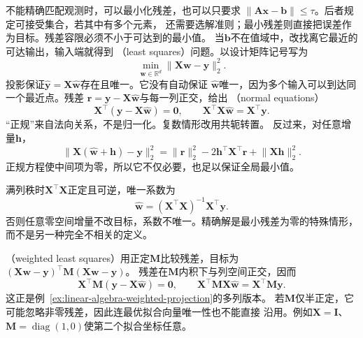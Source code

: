 \label{sec:matrix-analysis-inverse-input-selection}

不能精确匹配观测时，可以最小化残差，也可以只要求
$\lVert\bm A\bm x-\bm b\rVert\leq\tau$。后者规定可接受集合，若其中有多个元素，
还需要选解准则；最小残差则直接把误差作为目标。残差容限必须不小于可达到的最小值。
当$\bm b$不在值域中，改找离它最近的可达输出，输入端就得到
（least squares）问题。以设计矩阵记号写为
\begin{equation}
 \min_{\bm w\in\mathbb R^d}\lVert\bm X\bm w-\bm y\rVert_2^2.
 \label{eq:linear-algebra-least-squares}
\end{equation}
投影保证$\widehat{\bm y}=\bm X\widehat{\bm w}$存在且唯一。它没有自动保证
$\widehat{\bm w}$唯一，因为多个输入可以到达同一个最近点。残差
$\bm r=\bm y-\bm X\widehat{\bm w}$与每一列正交，给出
（normal equations）
\begin{equation}
 \bm X^\top(\bm y-\bm X\widehat{\bm w})=\bm0,
 \qquad
 \bm X^\top\bm X\widehat{\bm w}=\bm X^\top\bm y.
 \label{eq:linear-algebra-normal-equations}
\end{equation}
“正规”来自法向关系，不是归一化。复数情形改用共轭转置。
反过来，对任意增量$\bm h$，
\[
 \lVert\bm X(\widehat{\bm w}+\bm h)-\bm y\rVert_2^2
 =\lVert\bm r\rVert_2^2-2\bm h^\top\bm X^\top\bm r
  +\lVert\bm X\bm h\rVert_2^2.
\]
正规方程使中间项为零，所以它不仅必要，也足以保证全局最小值。

满列秩时$\bm X^\top\bm X$正定且可逆，唯一系数为
\begin{equation}
 \widehat{\bm w}=(\bm X^\top\bm X)^{-1}\bm X^\top\bm y.
 \label{eq:linear-algebra-full-rank-least-squares}
\end{equation}
否则任意零空间增量不改目标，系数不唯一。精确解是最小残差为零的特殊情形，
而不是另一种完全不相关的定义。

（weighted least squares）用正定$\bm M$比较残差，目标为
$(\bm X\bm w-\bm y)^\top\bm M(\bm X\bm w-\bm y)$。
残差在$\bm M$内积下与列空间正交，因而
\begin{equation}
 \bm X^\top\bm M(\bm y-\bm X\widehat{\bm w})=\bm0,\qquad
 \bm X^\top\bm M\bm X\widehat{\bm w}=\bm X^\top\bm M\bm y.
 \label{eq:linear-algebra-weighted-normal-equations}
\end{equation}
这正是例~\ref{ex:linear-algebra-weighted-projection}的多列版本。
若$\bm M$仅半正定，它可能忽略非零残差，因此连最优拟合向量唯一性也不能直接
沿用。例如$\bm X=\bm I$、$\bm M=\operatorname{diag}(1,0)$使第二个拟合坐标任意。

